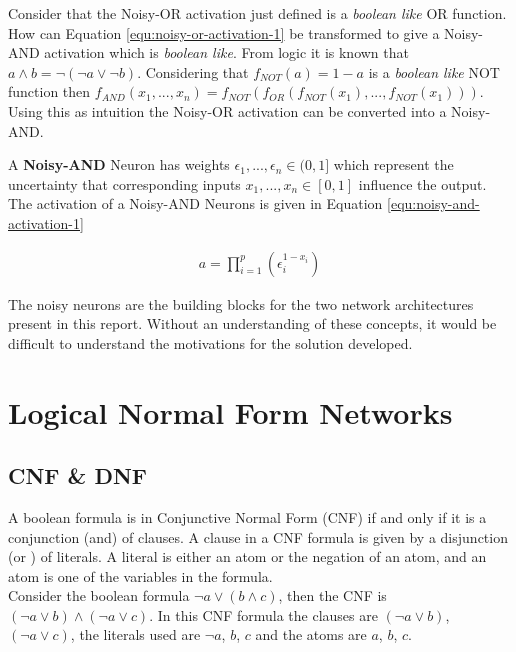 Consider that the Noisy-OR activation just defined is a \textit{boolean like} OR function. How can Equation \ref{equ:noisy-or-activation-1} be transformed to give a Noisy-AND activation which is \textit{boolean like}. From logic it is known that $a \land b = \lnot (\lnot a \lor \lnot b)$. Considering that $f_{NOT}(a) = 1 - a$ is a \textit{boolean like} NOT function then $f_{AND}(x_1, ..., x_n) = f_{NOT}(f_{OR}(f_{NOT}(x_1), ..., f_{NOT}(x_1)))$. Using this as intuition the Noisy-OR activation can be converted into a Noisy-AND.

\begin{definition}
	A \textbf{Noisy-AND} Neuron has weights $\epsilon_1, ..., \epsilon_n \in (0, 1]$ which represent the uncertainty that corresponding inputs $x_1, ..., x_n \in [0,1]$ influence the output. The activation of a Noisy-AND Neurons is given in Equation \ref{equ:noisy-and-activation-1}
	
	\begin{align}
	a = \prod^p_{i=1} (\epsilon_i^{1 - x_i})
	\label{equ:noisy-and-activation-1}
	\end{align}
\end{definition}

The noisy neurons are the building blocks for the two network architectures present in this report. Without an understanding of these concepts, it would be difficult to understand the motivations for the solution developed.

\section{Logical Normal Form Networks}
\subsection{CNF \& DNF}
A boolean formula is in Conjunctive Normal Form (CNF) if and only if it is a conjunction (and) of clauses. A clause in a CNF formula is given by a disjunction (or ) of literals. A literal is either an atom or the negation of an atom, and an atom is one of the variables in the formula.\\

Consider the boolean formula $\lnot a \lor (b \land c)$, then the CNF is $(\lnot a \lor b) \land (\lnot a \lor c)$. In this CNF formula the clauses are $(\lnot a \lor b)$, $(\lnot a \lor c)$, the literals used are $\lnot a$, $b$, $c$ and the atoms are $a$, $b$, $c$.\\

